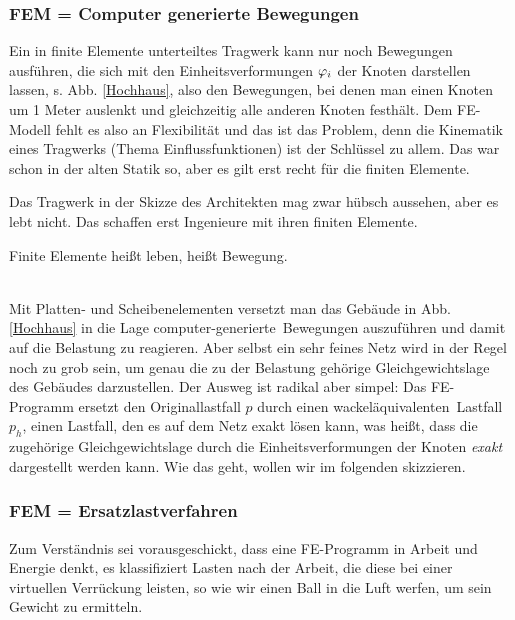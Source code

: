 \vspace{-0.5cm}
{\textcolor{sectionTitleBlue}{\subsubsection*{FEM = Computer generierte Bewegungen }}}

Ein in finite Elemente unterteiltes Tragwerk kann nur noch Bewegungen ausf\"{u}hren, die sich mit den Einheitsverformungen $\varphi_i$ der Knoten darstellen lassen, s. Abb. \ref{Hochhaus}, also den Bewegungen, bei denen man einen Knoten um 1 Meter auslenkt und gleichzeitig alle anderen Knoten festh\"{a}lt. Dem FE-Modell fehlt es also an Flexibilit\"{a}t und das ist das Problem, denn die Kinematik eines Tragwerks (Thema Einflussfunktionen) ist der Schl\"{u}ssel zu allem. Das war schon in der \glq alten Statik\grq{} so, aber es gilt erst recht f\"{u}r die finiten Elemente.

Das Tragwerk in der Skizze des Architekten mag zwar h\"{u}bsch aussehen, aber es lebt nicht. Das schaffen erst Ingenieure mit ihren finiten Elemente.\\

\hspace*{-12pt}\colorbox{highlightBlue}{\parbox{0.98\textwidth}{ Finite Elemente hei{\ss}t leben, hei{\ss}t Bewegung.}}\\

Mit Platten- und Scheibenelementen versetzt man das Geb\"{a}ude in Abb. \ref{Hochhaus} in die Lage \glq computer-generierte\grq\ Bewegungen auszuf\"{u}hren und damit auf die Belastung zu reagieren. Aber selbst ein sehr feines Netz wird in der Regel noch zu grob sein, um genau die zu der Belastung geh\"{o}rige Gleichgewichtslage des Geb\"{a}udes darzustellen. Der Ausweg ist radikal aber simpel: Das FE-Programm ersetzt den Originallastfall $p$ durch einen \glq wackel\"{a}quivalenten\grq\ Lastfall $p_h$, einen Lastfall, den es auf dem Netz exakt l\"{o}sen kann, was hei{\ss}t, dass die zugeh\"{o}rige Gleichgewichtslage durch die Einheitsverformungen der Knoten {\em exakt\/} dargestellt werden kann. Wie das geht, wollen wir im folgenden skizzieren.


{\textcolor{sectionTitleBlue}{\subsubsection*{FEM = Ersatzlastverfahren}}}

Zum Verst\"{a}ndnis sei vorausgeschickt, dass eine FE-Programm in Arbeit und Energie denkt, es klassifiziert Lasten nach der Arbeit, die diese bei einer virtuellen Verr\"{u}ckung leisten, so wie wir einen Ball in die Luft werfen, um sein Gewicht zu ermitteln.


